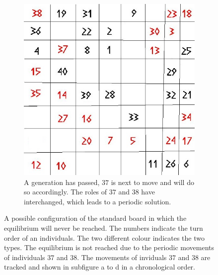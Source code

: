 \begin{figure}[H]
\begin{subfigure}{0.3\textwidth}
        \includegraphics[width=\textwidth]{Tegenvoorbeeld/segregation_tegenvb_3.jpg}
        \caption{A generation has passed, $37$ is next to move and will do so accordingly. The roles of  $37$ and $38$ have interchanged, which leads to a periodic solution. }
        \label{fig:movement4}
    \end{subfigure}
    \caption{A possible configuration of the standard board in which the equilibrium will never be reached. The numbers indicate the turn order of an individuals. The two different colour indicates the two types. The equilibrium is not reached due to the periodic movements of individuals $37$ and $38$. The movements of inviduals $37$ and $38$ are tracked and shown in subfigure a to d in a chronological order.}\label{fig:equilibrium counterexample}
\end{figure}



